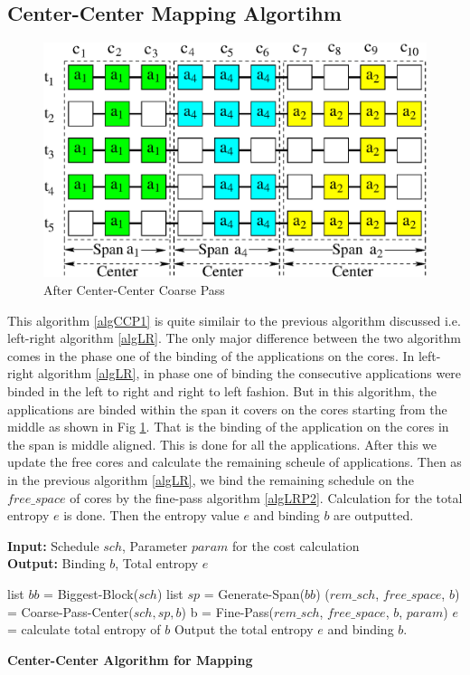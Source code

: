\documentclass[10pt, conference]{IEEEtran}
\begin{document}
\subsection{Center-Center Mapping Algortihm}
\begin{figure}[tb]
\centering 
\includegraphics[scale=0.5]{./figure/center_center.eps}
\vspace{0.0cm}\caption{After Center-Center Coarse Pass }
\vspace{-0.1cm}
\label{figCCP1}
\end{figure}
This algorithm \ref{algCCP1} is quite similair to the previous algorithm discussed i.e. left-right algorithm \ref{algLR}. The only major difference between the two algorithm comes in the phase one of the binding of the applications on the cores. In left-right algorithm \ref{algLR}, in phase one of binding the consecutive applications were binded in the left to right and right to left fashion. But in this algorithm, the applications are binded within the span it covers on the cores starting from the middle as shown in Fig \ref{figCCP1}. That is the binding of the application on the cores in the span is middle aligned. This is done for all the applications. After this we update the free cores and calculate the remaining scheule of applications. Then as in the previous algorithm \ref{algLR}, we bind the remaining schedule on the $free\_space$ of cores by the fine-pass algorithm \ref{algLRP2}. Calculation for the total entropy $e$ is done. Then the entropy value $e$ and binding $b$ are outputted.

\begin{algorithm}[tb]
\footnotesize
\textbf{Input:} Schedule $sch$, Parameter $param$ for the cost calculation \ \\
\textbf{Output:} Binding $b$, Total entropy $e$
\begin{algorithmic}[1]
\STATE list $bb$ = Biggest-Block($sch$)
\STATE list $sp$ = Generate-Span($bb$)
\STATE  ($rem\_sch$, $free\_space$, $b$) = Coarse-Pass-Center($sch, sp, b$)
\STATE b = Fine-Pass($rem\_sch$, $free\_space$, $b$, $param$)
\STATE  $e$ = calculate total entropy of $b$
\STATE Output the total entropy $e$ and binding $b$.
\end{algorithmic}
\caption{\textbf{Center-Center Algorithm for Mapping}}
\vspace{-0.1cm}
\label{algCC}
\end{algorithm}
\end{document}
